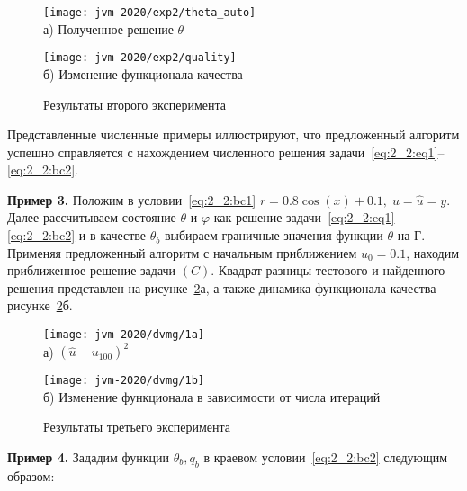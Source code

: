 \begin{figure}[h!t]
    \begin{minipage}[b][][b]{0.49\linewidth}
        \centering
        \texttt{[image: jvm-2020/exp2/theta\_auto]}
        \\ а) Полученное решение $\theta$
    \end{minipage}
    \hfill
    \begin{minipage}[b][][b]{0.49\linewidth}
        \centering
        \texttt{[image: jvm-2020/exp2/quality]}
        \\ б) Изменение функционала качества
    \end{minipage}
    \caption{Результаты второго эксперимента}
    \label{fig:4_4:1}
\end{figure}

Представленные численные примеры иллюстрируют, что предложенный алгоритм успешно справляется
с нахождением численного решения задачи~\eqref{eq:2_2:eq1}--\eqref{eq:2_2:bc2}.


\textbf{Пример 3.}
Положим в условии~\eqref{eq:2_2:bc1}
$r=0.8 \cos (x)+0.1,\; u=\hat{u}=y$.
Далее рассчитываем состояние $\theta$ и $\varphi$ как решение
задачи~\eqref{eq:2_2:eq1}--\eqref{eq:2_2:bc2}
и в качестве $\theta_{b}$ выбираем граничные значения функции $\theta$ на Г.
Применяя предложенный алгоритм с начальным приближением $u_{0}=0.1$,
находим приближенное решение задачи $(C)$.
Квадрат разницы тестового и найденного решения представлен на рисунке~\ref{fig:4_4:2}а,
а также динамика функционала качества рисунке~\ref{fig:4_4:2}б.

\begin{figure}[h!t]
    \begin{minipage}[b][][b]{0.49\linewidth}
        \centering
        \texttt{[image: jvm-2020/dvmg/1a]}
        \\ а) $\left(\hat{u}-u_{100}\right)^{2}$
    \end{minipage}
    \hfill
    \begin{minipage}[b][][b]{0.49\linewidth}
        \centering
        \texttt{[image: jvm-2020/dvmg/1b]}
        \\ б) Изменение функционала в зависимости от числа итераций
    \end{minipage}
    \caption{Результаты третьего эксперимента}
    \label{fig:4_4:2}
\end{figure}


\textbf{Пример 4.}
Зададим функции $\theta_{b}, q_{b}$ в краевом условии~\eqref{eq:2_2:bc2}
следующим образом:

